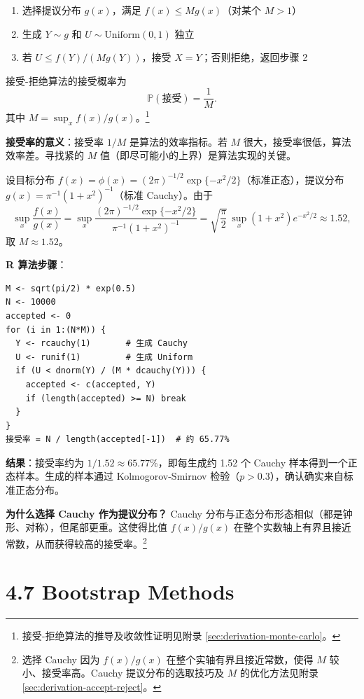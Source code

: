 \begin{enumerate}
\item 选择提议分布 $g(x)$，满足 $f(x) \leq Mg(x)$（对某个 $M > 1$）
\item 生成 $Y \sim g$ 和 $U \sim \mathrm{Uniform}(0,1)$ 独立
\item 若 $U \leq f(Y)/(Mg(Y))$，接受 $X = Y$；否则拒绝，返回步骤 2
\end{enumerate}

接受-拒绝算法的接受概率为
\[
\mathbb{P}(\text{接受}) = \frac{1}{M}.
\label{eq:accept-reject-probability}
\]
其中 $M = \sup_x f(x)/g(x)$。\footnote{接受-拒绝算法的推导及收敛性证明见附录 \cref{sec:derivation-monte-carlo}。}

\textbf{接受率的意义}：接受率 $1/M$ 是算法的效率指标。若 $M$ 很大，接受率很低，算法效率差。寻找紧的 $M$ 值（即尽可能小的上界）是算法实现的关键。

\begin{example}\label{ex:accept-reject-cauchy}
设目标分布 $f(x) = \phi(x) = (2\pi)^{-1/2}\exp\{-x^2/2\}$（标准正态），提议分布 $g(x) = \pi^{-1}(1+x^2)^{-1}$（标准 Cauchy）。由于
\[
\sup_x \frac{f(x)}{g(x)} = \sup_x \frac{(2\pi)^{-1/2}\exp\{-x^2/2\}}{\pi^{-1}(1+x^2)^{-1}}
= \sqrt{\frac{\pi}{2}}\,\sup_x (1+x^2)e^{-x^2/2} \approx 1.52,
\]
取 $M \approx 1.52$。

\textbf{R 算法步骤}：
\begin{verbatim}
M <- sqrt(pi/2) * exp(0.5)
N <- 10000
accepted <- 0
for (i in 1:(N*M)) {
  Y <- rcauchy(1)       # 生成 Cauchy
  U <- runif(1)         # 生成 Uniform
  if (U < dnorm(Y) / (M * dcauchy(Y))) {
    accepted <- c(accepted, Y)
    if (length(accepted) >= N) break
  }
}
接受率 = N / length(accepted[-1])  # 约 65.77%
\end{verbatim}

\textbf{结果}：接受率约为 $1/1.52 \approx 65.77\%$，即每生成约 1.52 个 Cauchy 样本得到一个正态样本。生成的样本通过 Kolmogorov-Smirnov 检验（$p > 0.3$），确认确实来自标准正态分布。

\textbf{为什么选择 Cauchy 作为提议分布？} Cauchy 分布与正态分布形态相似（都是钟形、对称），但尾部更重。这使得比值 $f(x)/g(x)$ 在整个实数轴上有界且接近常数，从而获得较高的接受率。\footnote{选择 Cauchy 因为 $f(x)/g(x)$ 在整个实轴有界且接近常数，使得 $M$ 较小、接受率高。Cauchy 提议分布的选取技巧及 $M$ 的优化方法见附录 \cref{sec:derivation-accept-reject}。}
\end{example}

\section{4.7 Bootstrap Methods}\label{sec:4.7}

